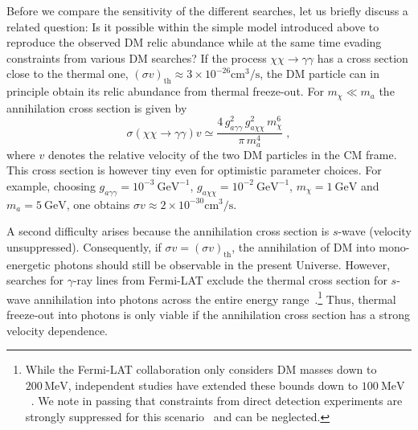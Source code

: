 \documentclass[11pt,a4paper]{article}
\newcommand{\ga}{g_{a\gamma\gamma}}
\begin{document}
Before we compare the sensitivity of the different searches, let us briefly discuss a related question: Is it possible within the simple model introduced above to reproduce the observed DM relic abundance while at the same time evading constraints from various DM searches? If the process $\chi \chi \to \gamma \gamma$ has a cross section close to the thermal one, $(\sigma v)_\text{th} \approx 3 \times 10^{-26} \mathrm{cm^3/s}$, the DM particle can in principle obtain its relic abundance from thermal freeze-out. For $m_\chi \ll m_a$ the annihilation cross section is given by
\begin{equation}
 \sigma(\chi \chi \to \gamma \gamma) v \simeq \frac{4 \, \ga^2 \, g_{a\chi\chi}^2 \, m_\chi^6}{\pi \, m_a^4} \; ,
\end{equation}
where $v$ denotes the relative velocity of the two DM particles in the CM frame. This cross section is however tiny even for optimistic parameter choices. For example, choosing $\ga = 10^{-3}\:\text{GeV}^{-1}$, $g_{a\chi\chi} = 10^{-2}\:\text{GeV}^{-1}$, $m_\chi = 1\:\text{GeV}$ and $m_a = 5\:\text{GeV}$, one obtains $\sigma v \approx 2 \times 10^{-30} \mathrm{cm^3 / s}$.

A second difficulty arises because the annihilation cross section is $s$-wave (velocity unsuppressed). Consequently, if $\sigma v = (\sigma v)_\text{th}$, the annihilation of DM into mono-energetic photons should still be observable in the present Universe. However, searches for $\gamma$-ray lines from Fermi-LAT exclude the thermal cross section for $s$-wave annihilation into photons across the entire energy range~\cite{Ackermann:2015lka}.\footnote{While the Fermi-LAT collaboration only considers DM masses down to $200\,\text{MeV}$, independent studies have extended these bounds down to $100\:\text{MeV}$~\cite{Albert:2014hwa}. We note in passing that constraints from direct detection experiments are strongly suppressed for this scenario~\cite{Frandsen:2012db} and can be neglected.} Thus, thermal freeze-out into photons is only viable if the annihilation cross section has a strong velocity dependence.
\end{document}
